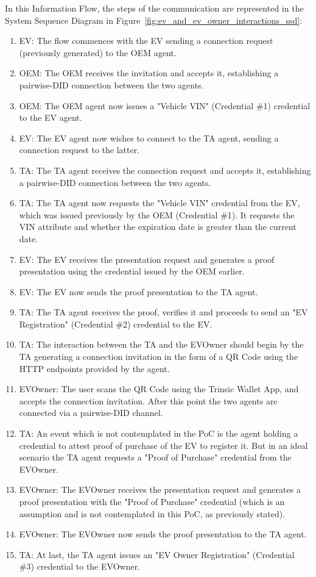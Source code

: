 In this Information Flow, the steps of the communication are represented in the System Sequence Diagram in Figure~\ref{fig:ev_and_ev_owner_interactions_ssd}:

\begin{enumerate}
    \item EV: The flow commences with the EV sending a connection request (previously generated) to the OEM agent.
    \item OEM: The OEM receives the invitation and accepts it, establishing a pairwise-DID connection between the two agents.
    \item OEM: The OEM agent now issues a "Vehicle VIN" (Credential \#1) credential to the EV agent.
    \item EV: The EV agent now wishes to connect to the TA agent, sending a connection request to the latter.
    \item TA: The TA agent receives the connection request and accepts it, establishing a pairwise-DID connection between the two agents.
    \item TA: The TA agent now requests the "Vehicle VIN" credential from the EV, which was issued previously by the OEM (Credential \#1). It requests the VIN attribute and whether the expiration date is greater than the current date.
    \item EV: The EV receives the presentation request and generates a proof presentation using the credential issued by the OEM earlier.
    \item EV: The EV now sends the proof presentation to the TA agent.
    \item TA: The TA agent receives the proof, verifies it and proceeds to send an "EV Registration" (Credential \#2) credential to the EV.
    \item TA: The interaction between the TA and the EVOwner should begin by the TA generating a connection invitation in the form of a QR Code using the HTTP endpoints provided by the agent. 
    \item EVOwner: The user scans the QR Code using the Trinsic Wallet App, and accepts the connection invitation. After this point the two agents are connected via a pairwise-DID channel.
    \item TA: An event which is not contemplated in the PoC is the agent holding a credential to attest proof of purchase of the EV to register it. But in an ideal scenario the TA agent requests a "Proof of Purchase" credential from the EVOwner.
    \item EVOwner: The EVOwner receives the presentation request and generates a proof presentation with the "Proof of Purchase" credential (which is an assumption and is not contemplated in this PoC, as previously stated).
    \item EVOwner: The EVOwner now sends the proof presentation to the TA agent.
    \item TA: At last, the TA agent issues an "EV Owner Registration" (Credential \#3) credential to the EVOwner.
    
\end{enumerate}

